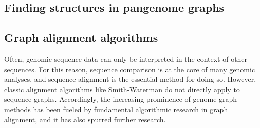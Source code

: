 


\subsection{Finding structures in pangenome graphs}


\subsection{Graph alignment algorithms}

Often, genomic sequence data can only be interpreted in the context of other sequences. 
For this reason, sequence comparison is at the core of many genomic analyses, and sequence alignment is the essential method for doing so. 
However, classic alignment algorithms like Smith-Waterman \cite{Smith_1981} do not directly apply to sequence graphs. 
Accordingly, the increasing prominence of genome graph methods has been fueled by fundamental algorithmic research in graph alignment, and it has also spurred further research.

